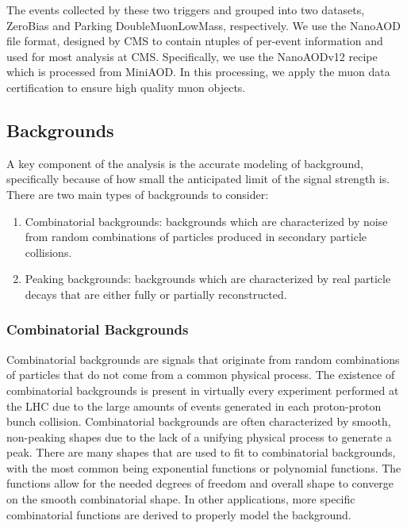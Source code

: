 The events collected by these two triggers and grouped into two datasets, ZeroBias and Parking DoubleMuonLowMass, respectively. We use the NanoAOD file format, designed by CMS to contain ntuples of per-event information and used for most analysis at CMS. Specifically, we use the NanoAODv12 recipe which is processed from MiniAOD. In this processing, we apply the muon data certification to ensure high quality muon objects. 

\subsection{Backgrounds}
\label{subsec:backgrounds}

A key component of the analysis is the accurate modeling of background, specifically because of how small the anticipated limit of the signal strength is. There are two main types of backgrounds to consider: 
\begin{enumerate}
    \item Combinatorial backgrounds: backgrounds which are characterized by noise from random combinations of particles produced in secondary particle collisions. 
    \item Peaking backgrounds: backgrounds which are characterized by real particle decays that are either fully or partially reconstructed.
\end{enumerate}

\subsubsection{Combinatorial Backgrounds}

Combinatorial backgrounds are signals that originate from random combinations of particles that do not come from a common physical process. The existence of combinatorial backgrounds is present in virtually every experiment performed at the LHC due to the large amounts of events generated in each proton-proton bunch collision. Combinatorial backgrounds are often characterized by smooth, non-peaking shapes due to the lack of a unifying physical process to generate a peak. There are many shapes that are used to fit to combinatorial backgrounds, with the most common being exponential functions or polynomial functions. The functions allow for the needed degrees of freedom and overall shape to converge on the smooth combinatorial shape. In other applications, more specific combinatorial functions are derived to properly model the background. 

